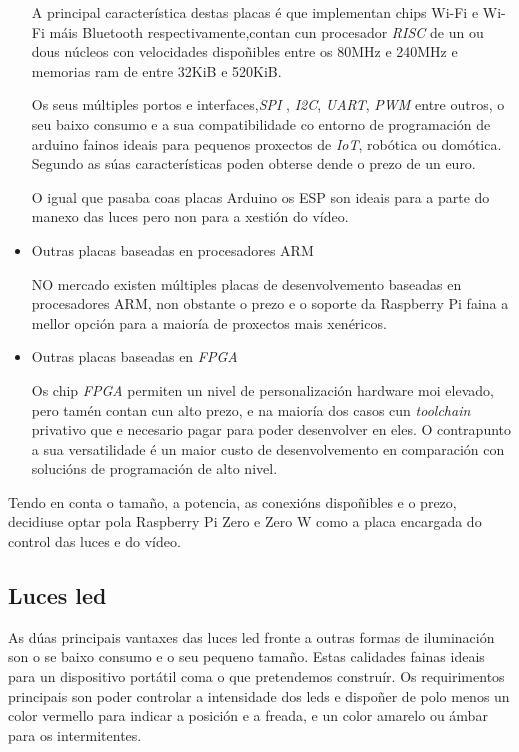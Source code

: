 \begin{itemize}
A principal característica destas placas é que implementan chips Wi-Fi e Wi-Fi máis Bluetooth respectivamente,contan cun procesador \emph{RISC} de un ou dous núcleos con velocidades dispoñibles entre os 80MHz e 240MHz e memorias ram de entre 32KiB e 520KiB.

Os seus múltiples portos e interfaces,\emph{SPI} ,  \emph{I2C}, \emph{UART}, \emph{PWM} entre outros, o seu baixo consumo e a sua compatibilidade co entorno de programación de arduino fainos ideais para pequenos proxectos de \emph{IoT}, robótica ou domótica. Segundo as súas características poden obterse dende o prezo de un euro.

O igual que pasaba coas placas Arduino os ESP son ideais para a parte do manexo das luces pero non para a xestión do vídeo.
    \item Outras placas baseadas en procesadores ARM

NO mercado existen múltiples placas de desenvolvemento baseadas en procesadores ARM, non obstante o prezo e o soporte da Raspberry Pi faina a mellor opción para a maioría de proxectos mais xenéricos.
    \item Outras placas baseadas en \emph{FPGA}

Os chip \emph{FPGA} permiten un nivel de personalización hardware moi elevado, pero tamén contan cun alto prezo, e na maioría dos casos cun \emph{toolchain} privativo que e necesario pagar para poder desenvolver en eles. O contrapunto a sua versatilidade é un maior custo de desenvolvemento en comparación con solucións de programación de alto nivel.
\end{itemize}
Tendo en conta o tamaño, a potencia, as conexións dispoñibles e o prezo, decidiuse optar pola Raspberry Pi Zero e Zero W como a placa encargada do control das luces e do vídeo.

\subsection{Luces led}
As dúas principais vantaxes das luces led fronte a outras formas de iluminación son o se baixo consumo e o seu pequeno tamaño. Estas calidades fainas ideais para un dispositivo portátil coma o que pretendemos construír.
Os requirimentos principais son poder controlar a intensidade dos leds e dispoñer de polo menos un color vermello para indicar a posición e a freada, e un color amarelo ou ámbar para os intermitentes.


